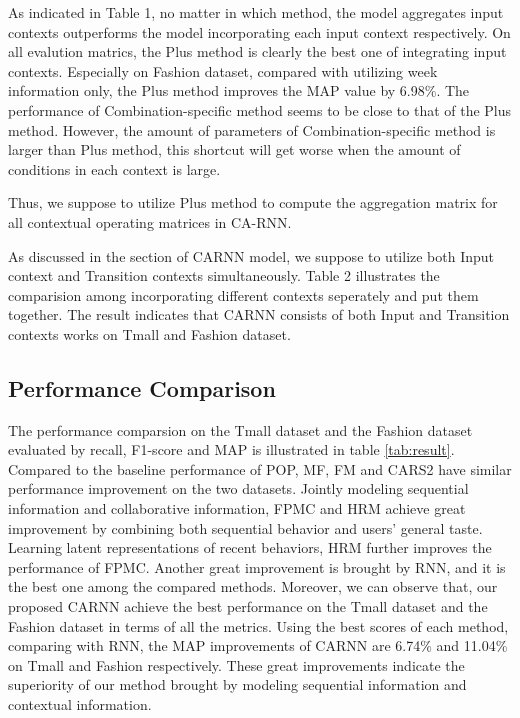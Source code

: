 \documentclass[conference]{IEEEtran}
\begin{document}
As indicated in Table 1, no matter in which method, the model aggregates input contexts outperforms the model incorporating each input context respectively. On all evalution matrics, the Plus method is clearly the best one of integrating input contexts. Especially on Fashion dataset, compared with utilizing week information only, the Plus method improves the MAP value by 6.98\%. The performance of Combination-specific method seems to be close to that of the Plus method. However, the amount of parameters of Combination-specific method is larger than Plus method, this shortcut will get worse when the amount of conditions in each context is large. 

Thus, we suppose to utilize Plus method to compute the aggregation matrix for all contextual operating matrices in CA-RNN.

As discussed in the section of CARNN model, we suppose to utilize both Input context and Transition contexts simultaneously. Table 2  illustrates the comparision among incorporating different contexts seperately and put them together. The result indicates that CARNN consists of both Input and Transition contexts works on Tmall and Fashion dataset. 


\subsection{Performance Comparison}
The performance comparsion on the Tmall dataset and the Fashion dataset evaluated by recall, F1-score and MAP is illustrated in table \ref{tab:result}. Compared to the baseline performance of POP, MF, FM and CARS2 have similar performance improvement on the two datasets. Jointly modeling sequential information and collaborative information, FPMC and HRM achieve great improvement by combining both sequential behavior and users’ general taste. Learning latent representations of recent behaviors, HRM further improves the performance of FPMC. Another great improvement is brought by RNN, and it is the best one among the compared methods. Moreover, we can observe that, our proposed CARNN achieve the best performance on the Tmall dataset and the Fashion dataset in terms of all the metrics. Using the best scores of each method, comparing with RNN, the MAP improvements of CARNN are 6.74\% and 11.04\% on Tmall and Fashion respectively. These great improvements indicate the superiority of our method brought by modeling sequential information and contextual information.
\end{document}
